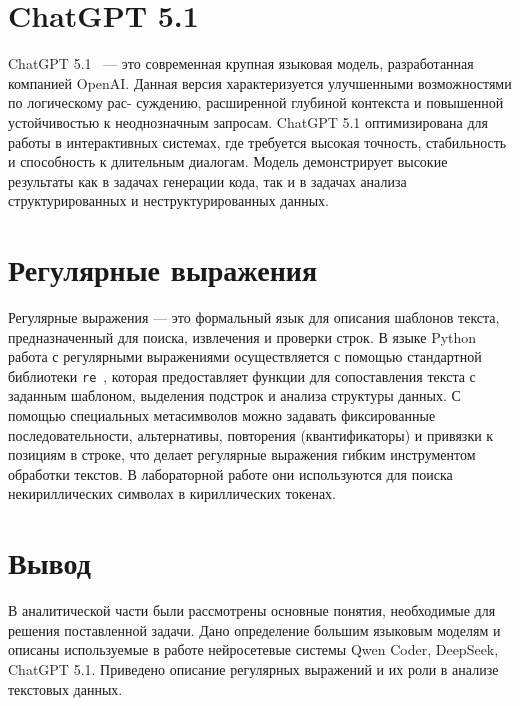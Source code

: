 \section{ChatGPT 5.1}

ChatGPT 5.1~\cite{chat-gpt} --- это современная крупная языковая модель, разработанная компанией
OpenAI. Данная версия характеризуется улучшенными возможностями по логическому рас-
суждению, расширенной глубиной контекста и повышенной устойчивостью к неоднозначным
запросам. ChatGPT 5.1 оптимизирована для работы в интерактивных системах, где требуется
высокая точность, стабильность и способность к длительным диалогам. Модель демонстрирует
высокие результаты как в задачах генерации кода, так и в задачах анализа структурированных
и неструктурированных данных.

\section{Регулярные выражения}

Регулярные выражения --- это формальный язык для описания шаблонов текста, предназначенный для поиска, извлечения и проверки строк.
В языке Python работа с регулярными выражениями осуществляется с помощью стандартной библиотеки \texttt{re}~\cite{python-re},
которая предоставляет функции для сопоставления текста с заданным шаблоном,
выделения подстрок и анализа структуры данных.
С помощью специальных метасимволов можно задавать фиксированные последовательности,
альтернативы, повторения (квантификаторы) и привязки к позициям в строке,
что делает регулярные выражения гибким инструментом обработки текстов.
В лабораторной работе они используются для поиска некириллических символах в кириллических токенах.

\section{Вывод}

В аналитической части были рассмотрены основные понятия, необходимые для решения
поставленной задачи. Дано определение большим языковым моделям и описаны используемые
в работе нейросетевые системы Qwen Coder, DeepSeek, ChatGPT 5.1. Приведено описание
регулярных выражений и их роли в анализе текстовых данных.

